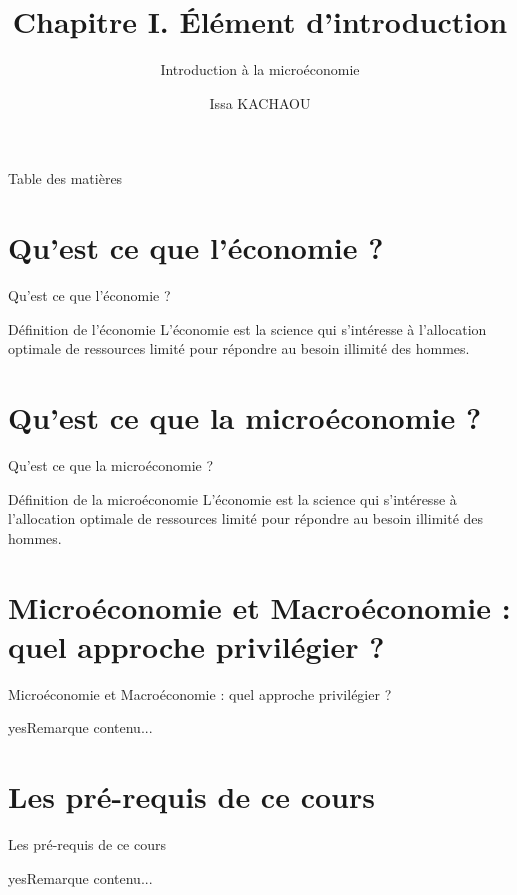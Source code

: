 \documentclass{beamer}
\title{Chapitre I. Élément d'introduction}
\subtitle{Introduction à la microéconomie}
\author{Issa KACHAOU}
\begin{document}
	\begin{frame}[plain]
		\maketitle
	\end{frame}


\begin{frame}{Table des matières}
\tableofcontents	
\end{frame}

\section{Qu'est ce que l'économie ?}
	\begin{frame}{Qu'est ce que l'économie ?}
		\begin{alertblock}{Définition de l'économie} 
		L'économie est la science qui s'intéresse à l'allocation optimale de ressources limité pour répondre au besoin illimité des hommes.
		\end{alertblock}

	\end{frame}
	
\section{Qu'est ce que la microéconomie ?}
	\begin{frame}{Qu'est ce que la microéconomie ?}

\begin{alertblock}{Définition de la microéconomie} 
	L'économie est la science qui s'intéresse à l'allocation optimale de ressources limité pour répondre au besoin illimité des hommes.
\end{alertblock}

	\end{frame}
	
\section{Microéconomie et Macroéconomie : quel approche privilégier ?}
	\begin{frame}{Microéconomie et Macroéconomie : quel approche privilégier ?}
				\begin{block}{yes}{Remarque}
			contenu...
		\end{block}
	\end{frame}
	
	
\section{Les pré-requis de ce cours}
	\begin{frame}{Les pré-requis de ce cours}
		\begin{block}{yes}{Remarque}
			contenu...
		\end{block}
	\end{frame}
	
\end{document}
